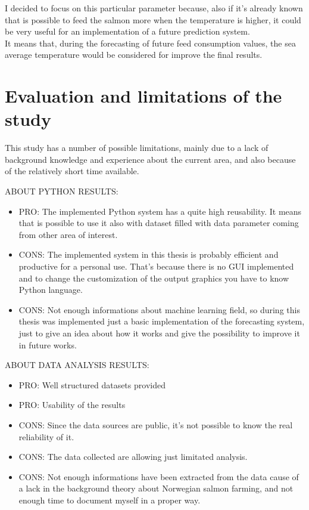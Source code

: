 \vspace{+10mm}

I decided to focus on this particular parameter because, also if it's already known that is possible to feed the salmon more when the temperature is higher, it could be very useful for an implementation of a future prediction system.\\
It means that, during the forecasting of future feed consumption values, the sea average temperature would be considered for improve the final results.

\newpage

\section{Evaluation and limitations of the study}
\vspace{-5mm}
This study has a number of possible limitations, mainly due to a lack of background knowledge and experience about the current area, and also because of the relatively short time available.

ABOUT PYTHON RESULTS:
\vspace{-5mm}
\begin{itemize}
 \setlength{\itemsep}{-5pt}
\item PRO: The implemented Python system has a quite high reusability. It means that is possible to use it also with dataset filled with data parameter coming from other area of interest.
\item CONS: The implemented system in this thesis is probably efficient and productive for a personal use. That's because there is no GUI implemented and to change the customization of the output graphics you have to know Python language.
\item CONS: Not enough informations about machine learning field, so during this thesis was implemented just a basic implementation of the forecasting system, just to give an idea about how it works and give the possibility to improve it in future works.
\end{itemize}


ABOUT DATA ANALYSIS RESULTS:
\vspace{-5mm}
\begin{itemize}
 \setlength{\itemsep}{-5pt}
 \item PRO: Well structured datasets provided
 \item PRO: Usability of the results 
 \item CONS: Since the data sources are public, it's not possible to know the real reliability of it.
 \item CONS: The data collected are allowing just limitated analysis.
 \item CONS: Not enough informations have been extracted from the data cause of a lack in the background theory about Norwegian salmon farming, and not enough time to document myself in a proper way.
\end{itemize}


